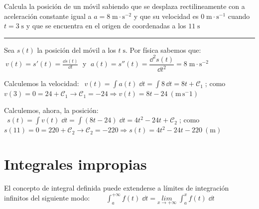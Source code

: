 \begin{miejercicio}

Calcula la posición de un móvil sabiendo que se desplaza rectilineamente con a aceleración constante igual a $a=8 \; \mathrm{m}\cdot \mathrm{s}^{-2}$ y que su velocidad es $0\; \mathrm{m}\cdot \mathrm{s}^{-1}$ cuando $t=3 \; \mathrm{s}$ y que se encuentra en el origen de coordenadas a los $11 \; \mathrm{s}$
	
\rule{200pt}{0.1pt}

\vspace{3mm}
	
	Sea $s(t)$ la posición del móvil a los $t\; \mathrm{s}$. Por física sabemos que: $ \displaystyle \  v(t)=s'(t)=\frac {\dd s(t)}{\dd t}\; $ y $\; a(t)=s''(t)=\dfrac {\dd^2 s(t)}{\dd t^2}=8\; \mathrm{m}\cdot \mathrm{s}^{-2}$
	
\vspace{2mm}	Calculemos la velocidad: $\ \ \displaystyle v(t)=\int a(t)\; \dd t = \int 8 \, \dd t =8t +\mathcal {C}_1\; $; como $v(3)=0=24+\mathcal {C}_1 \to  \mathcal {C}_1=-24 \Rightarrow v(t)=8t-24 \ (\mathrm{m}\, \mathrm{s}^-1)$
	
\vspace{2mm}	Calculemos, ahora, la posición: $\ \ \displaystyle s(t)=\int v(t)\; \dd t = \int (8t-24)\; \dd t = 4t^2 -24t +\mathcal {C}_2\; $; como $s(11)=0=220+\mathcal {C}_2 \to \mathcal{C}_2=-220 \Rightarrow s(t)=4t^2-24t-220 \ (\mathrm{m})$ 
	
\end{miejercicio}








\section{Integrales impropias}	
\label{integrales-impropias}



\vspace{1cm}


El concepto de integral definida puede extenderse a límites de integración infinitos del siguiente modo:
$\qquad \displaystyle \int_a^{+\infty} f(t)\; \dd t = \underset{x\to + \infty}{lim}\;{\int_a^x f(t)\; \dd t}$

